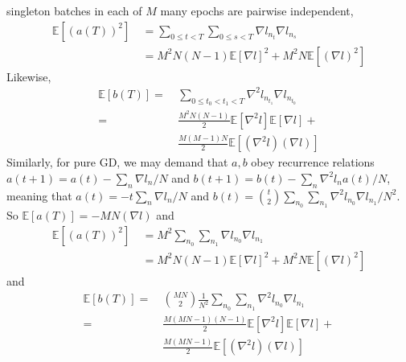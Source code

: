 \documentclass[openany, notitlepage, justified]{tufte-book}
\theoremstyle{plain}
\theoremstyle{definition}
\newcommand{\expct}[1]{\mathbb{E}\left[#1\right]}
\begin{document}
\begin{shaded}
                singleton batches in each of $M$ many epochs are pairwise
                independent,
                \begin{align*}
                    \expct{(a(T))^2}
                    ~&=
                    \sum_{0\leq t<T} \sum_{0\leq s<T} \nabla l_{n_t} \nabla l_{n_s} \\
                    ~&= 
                    M^2N(N-1)   \expct{\nabla l}^2 +
                    M^2N        \expct{(\nabla l)^2}
                \end{align*}
                Likewise, 
                \begin{align*}
                    \expct{b(T)}
                    = 
                    ~&\sum_{0\leq t_0 < t_1 < T} \nabla^2 l_{n_{t_1}} \nabla l_{n_{t_0}} \\
                    =
                    ~&\frac{M^2N(N-1)}{2} \expct{\nabla^2 l} \expct{\nabla l} + \\
                    ~&\frac{M(M-1)N}{2}  \expct{(\nabla^2 l) (\nabla l)} 
                \end{align*}
                Similarly, for pure GD, we may demand that $a, b$ obey recurrence
                relations $a(t+1) = a(t) - \sum_n \nabla l_n/N$ and
                $b(t+1) = b(t) - \sum_n \nabla^2 l_n a(t)/N$, meaning that
                $a(t) = -t \sum_n \nabla l_n/N$ and
                $b(t) = {t \choose 2} \sum_{n_0} \sum_{n_1} \nabla^2 l_{n_0} \nabla l_{n_1}/N^2$.
                So $\expct{a(T)} = -MN(\nabla l)$ and
                \begin{align*}
                    \expct{(a(T))^2}
                    ~&=
                    M^2 
                    \sum_{n_0} \sum_{n_1} \nabla l_{n_0} \nabla l_{n_1} \\
                    ~&= 
                    M^2 N(N-1)  \expct{\nabla l}^2 + 
                    M^2 N       \expct{(\nabla l)^2}
                \end{align*}
                and
                \begin{align*}
                    \expct{b(T)}
                    = 
                    ~&{MN \choose 2}\frac{1}{N^2}
                    \sum_{n_0} \sum_{n_1} \nabla^2 l_{n_0} \nabla l_{n_1} \\
                    =
                    ~&\frac{M(MN-1)(N-1)}{2} \expct{\nabla^2 l} \expct{\nabla l} + \\
                    ~&\frac{M(MN-1)}{2}      \expct{(\nabla^2 l) (\nabla l)} 
                \end{align*}

\end{shaded}
\end{document}
